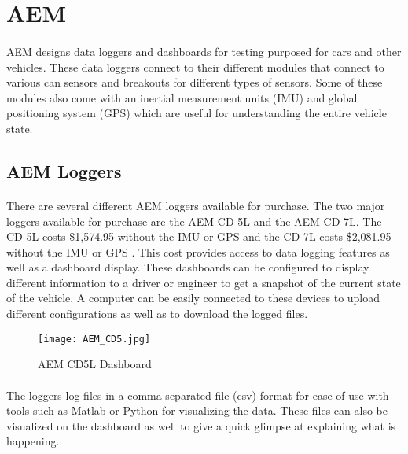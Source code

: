 \section{AEM}

\paragraph{}
AEM designs data loggers and dashboards for testing purposed for cars and other vehicles.
These data loggers connect to their different modules that connect to various can sensors and breakouts for different types of sensors.
Some of these modules also come with an inertial measurement units (IMU) and global positioning system (GPS) which are useful for understanding the entire vehicle state.

\subsection{AEM Loggers}

\paragraph{}
There are several different AEM loggers available for purchase.
The two major loggers available for purchase are the AEM CD-5L and the AEM CD-7L.
The CD-5L costs \$1,574.95 without the IMU or GPS and the CD-7L costs \$2,081.95 without the IMU or GPS \cite{AEMSite}.
This cost provides access to data logging features as well as a dashboard display.
These dashboards can be configured to display different information to a driver or engineer to get a snapshot of the current state of the vehicle.
A computer can be easily connected to these devices to upload different configurations as well as to download the logged files.

\begin{figure}[H]
	\centering
	\texttt{[image: AEM\_CD5.jpg]}
	\caption{AEM CD5L Dashboard}
	\label{fig:AEM_CD5}
\end{figure}

\paragraph{}
The loggers log files in a comma separated file (csv) format for ease of use with tools such as Matlab or Python for visualizing the data.
These files can also be visualized on the dashboard as well to give a quick glimpse at explaining what is happening.

